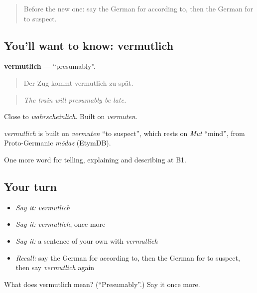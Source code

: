 \label{lesson:GE-C275-vermutlich}



\begin{quote}
Before the new one: say the German for according to, then the German for to suspect.
\end{quote}

\subsection*{You'll want to know: vermutlich}
\textbf{vermutlich} — \textquotedblleft{}presumably\textquotedblright{}.

\begin{quote}
Der Zug kommt vermutlich zu spät.
\end{quote}

\begin{quote}
\emph{The train will presumably be late.}
\end{quote}

Close to \emph{wahrscheinlich}. Built on \emph{vermuten}.

\begin{cousinweb}
\emph{vermutlich} is built on \emph{vermuten} \textquotedblleft{}to suspect\textquotedblright{}, which rests on \emph{Mut} \textquotedblleft{}mind\textquotedblright{}, from Proto-Germanic \emph{mōdaz} (EtymDB).
\end{cousinweb}

\begin{grammarlens}[title={What you've built}]
One more word for telling, explaining and describing at B1.
\end{grammarlens}

\subsection*{Your turn}
\begin{itemize}
\raggedright
  \item \emph{Say it:} \emph{vermutlich}
  \item \emph{Say it:} \emph{vermutlich}, once more
  \item \emph{Say it:} a sentence of your own with \emph{vermutlich}
  \item \emph{Recall:} say the German for according to, then the German for to suspect, then say \emph{vermutlich} again
\end{itemize}

\begin{tcolorbox}[breakable,colback=teal!4,colframe=teal!35!black,title={Before you move on}]
What does vermutlich mean? (\textquotedblleft{}Presumably\textquotedblright{}.) Say it once more.
\end{tcolorbox}
